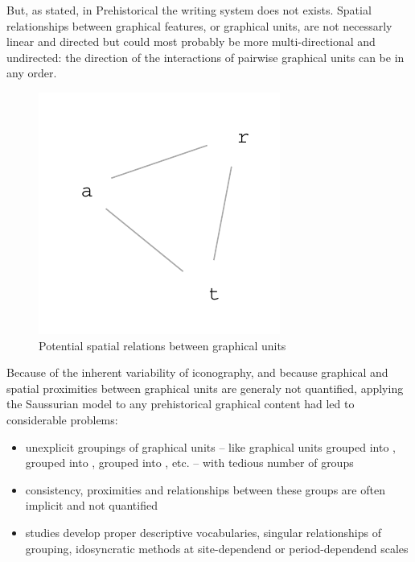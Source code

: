 \documentclass[article]{jss}\usepackage{knitr}
\begin{document}
But, as stated, in Prehistorical the writing system does not exists. Spatial relationships between graphical features, or graphical units, are not necessarly linear and directed but could most probably be more multi-directional and undirected: the direction of the interactions of pairwise graphical units can be in any order.

\begin{figure}[H]

{\centering \includegraphics[width=\maxwidth]{figure/unnamed-chunk-1-1} 

}

\caption{\label{fig:figs}Potential spatial relations between graphical units}\label{fig:unnamed-chunk-1}
\end{figure}



Because of the inherent variability of iconography, and because graphical and spatial proximities between graphical units are generaly not quantified, applying the Saussurian model to any prehistorical graphical content had led to considerable problems:
\begin{itemize}
\setlength\itemsep{.05em}
  \item unexplicit groupings of graphical units -- like graphical units grouped into ,   grouped into ,  grouped into , etc. -- with tedious number of groups
  \item consistency, proximities and relationships between these groups are often implicit and not quantified
  \item studies develop proper descriptive vocabularies, singular relationships of grouping, idosyncratic methods at site-dependend or period-dependend scales 
\end{itemize}
\end{document}

